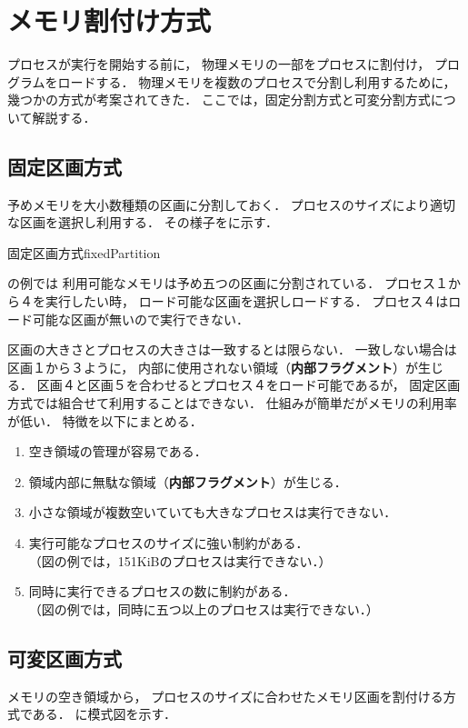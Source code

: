 \chapter{メモリ割付け方式}
プロセスが実行を開始する前に，
物理メモリの一部をプロセスに割付け，
プログラムをロードする．
物理メモリを複数のプロセスで分割し利用するために，
幾つかの方式が考案されてきた．
ここでは，固定分割方式と可変分割方式について解説する．

\section{固定区画方式}
予めメモリを大小数種類の区画に分割しておく．
プロセスのサイズにより適切な区画を選択し利用する．
その様子をに示す．

{固定区画方式}{fixedPartition}

の例では
利用可能なメモリは予め五つの区画に分割されている．
プロセス１から４を実行したい時，
ロード可能な区画を選択しロードする．
プロセス４はロード可能な区画が無いので実行できない．

区画の大きさとプロセスの大きさは一致するとは限らない．
一致しない場合は区画１から３ように，
内部に使用されない領域（{\bf 内部フラグメント}）が生じる．
区画４と区画５を合わせるとプロセス４をロード可能であるが，
固定区画方式では組合せて利用することはできない．
仕組みが簡単だがメモリの利用率が低い．
特徴を以下にまとめる．

\begin{enumerate}
\item 空き領域の管理が容易である．
\item 領域内部に無駄な領域（{\bf 内部フラグメント}）が生じる．
\item 小さな領域が複数空いていても大きなプロセスは実行できない．
\item 実行可能なプロセスのサイズに強い制約がある．\\
（図の例では，151KiBのプロセスは実行できない．）
\item 同時に実行できるプロセスの数に制約がある．\\
（図の例では，同時に五つ以上のプロセスは実行できない．）
\end{enumerate}

\section{可変区画方式}
メモリの空き領域から，
プロセスのサイズに合わせたメモリ区画を割付ける方式である．
に模式図を示す．

